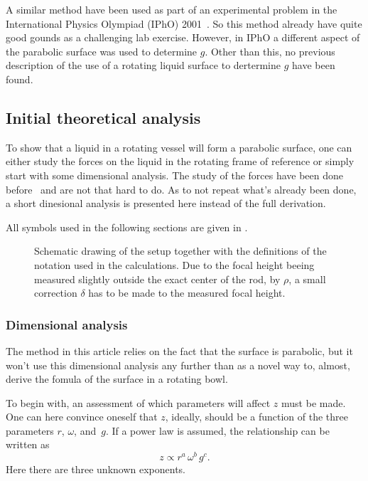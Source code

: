 \documentclass[11pt,towcolumn, swedish, english]{article}
\begin{document}
A similar method have been used as part of an experimental
problem in the International Physics Olympiad (IPhO\footnotemark{})
2001~\cite{IPhO2001}. So this method already have quite good gounds as
a challenging lab exercise. However, in IPhO a different aspect of the
parabolic surface was used to determine $g$. Other than this, no
previous description of the use of a rotating liquid surface to
dertermine $g$ have been found.



\subsection{Initial theoretical analysis}
To show that a liquid in a rotating vessel will form a parabolic
surface, one can either study the forces on the liquid in the rotating
frame of reference or simply start with some dimensional analysis. The
study of the forces have been done before~\cite{Sabatka2010, Berg1990}
and are not that hard to do. As to not repeat what's already been
done, a short dinesional analysis is presented here instead of the
full derivation. 

All symbols used in the following sections are given in
. 

\begin{figure}\centering
\resizebox{.6\linewidth}{!}{}
\caption{Schematic drawing of the setup together with the definitions
  of the notation used in the calculations. Due to the focal height
  beeing measured slightly outside the exact center of the rod, by
  $\rho$, a small correction $\delta$ has to be made to the measured
  focal height.} 
\label{fig:rot_bowl} 
\end{figure}

\subsubsection{Dimensional analysis}
The method in this article relies on the fact that the surface is
parabolic, but it won't use this dimensional analysis any further than
as a novel way to, almost, derive the fomula of the surface in a
rotating bowl. 

To begin with, an assessment of which parameters will affect $z$ must
be made. One can here convince oneself that $z$, ideally, should be a
function of the three parameters $r$, $\omega$, and~$g$. If a power
law is assumed, the relationship can be written as
\begin{equation}
z\propto r^a\, \omega^b\, g^c.
\end{equation}
Here there are three unknown exponents.
\end{document}
